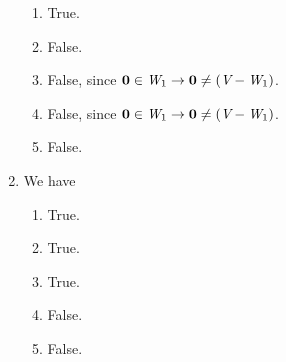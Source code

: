 \documentclass[a4paper,12pt]{article}
\begin{document}
\begin{enumerate}
\begin{enumerate}[label=(\alph*)]
        \item True.
        \item False.
        \item False, since $\boldsymbol{0} \in \textit{W}_1 \rightarrow \boldsymbol{0} \neq (\textit{V} - \textit{W}_1)$.
        \item False, since $\boldsymbol{0} \in \textit{W}_1 \rightarrow \boldsymbol{0} \neq (\textit{V} - \textit{W}_1)$.
        \item False.
    \end{enumerate}
    \item We have \begin{enumerate}[label=(\alph*)]
        \item True.
        \item True.
        \item True.
        \item False.
        \item False.
    \end{enumerate}
\end{enumerate}

\end{document}
